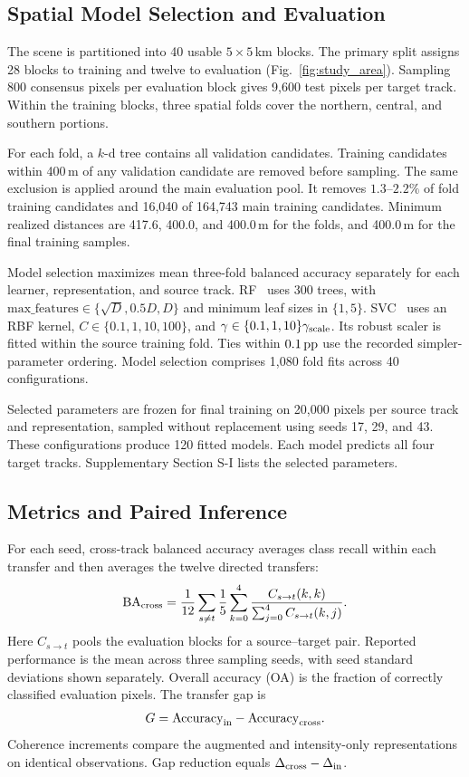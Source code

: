 \subsection{Spatial Model Selection and Evaluation}
\label{sec:partition}
The scene is partitioned into 40 usable $5\times5$\,km blocks. The primary split assigns 28 blocks to training and twelve to evaluation (Fig.~\ref{fig:study_area}). Sampling 800 consensus pixels per evaluation block gives 9,600 test pixels per target track. Within the training blocks, three spatial folds cover the northern, central, and southern portions.

For each fold, a $k$-d tree contains all validation candidates. Training candidates within 400\,m of any validation candidate are removed before sampling. The same exclusion is applied around the main evaluation pool. It removes $1.3$--$2.2\%$ of fold training candidates and 16,040 of 164,743 main training candidates. Minimum realized distances are 417.6, 400.0, and 400.0\,m for the folds, and 400.0\,m for the final training samples.

Model selection maximizes mean three-fold balanced accuracy separately for each learner, representation, and source track. RF~\cite{Breiman2001} uses 300 trees, with $\mathrm{max\_features}\in\{\sqrt{D},0.5D,D\}$ and minimum leaf sizes in $\{1,5\}$. SVC~\cite{Cortes1995} uses an RBF kernel, $C\in\{0.1,1,10,100\}$, and $\gamma\in\{0.1,1,10\}\gamma_{\rm scale}$. Its robust scaler is fitted within the source training fold. Ties within $0.1\,\mathrm{pp}$ use the recorded simpler-parameter ordering. Model selection comprises 1,080 fold fits across 40 configurations.

Selected parameters are frozen for final training on 20,000 pixels per source track and representation, sampled without replacement using seeds 17, 29, and 43. These configurations produce 120 fitted models. Each model predicts all four target tracks. Supplementary Section S-I lists the selected parameters.

\subsection{Metrics and Paired Inference}
For each seed, cross-track balanced accuracy averages class recall within each transfer and then averages the twelve directed transfers:
\begin{equation}
\mathrm{BA}_{\rm cross}=\frac{1}{12}\sum_{s\ne t}\frac{1}{5}\sum_{k=0}^{4}\frac{C_{s\to t}(k,k)}{\sum_{j=0}^{4}C_{s\to t}(k,j)}.
\end{equation}
Here $C_{s\to t}$ pools the evaluation blocks for a source--target pair. Reported performance is the mean across three sampling seeds, with seed standard deviations shown separately. Overall accuracy (OA) is the fraction of correctly classified evaluation pixels. The transfer gap is
\begin{equation}
G=\mathrm{Accuracy}_{\rm in}-\mathrm{Accuracy}_{\rm cross}.
\end{equation}
Coherence increments compare the augmented and intensity-only representations on identical observations. Gap reduction equals $\Delta_{\rm cross}-\Delta_{\rm in}$.

